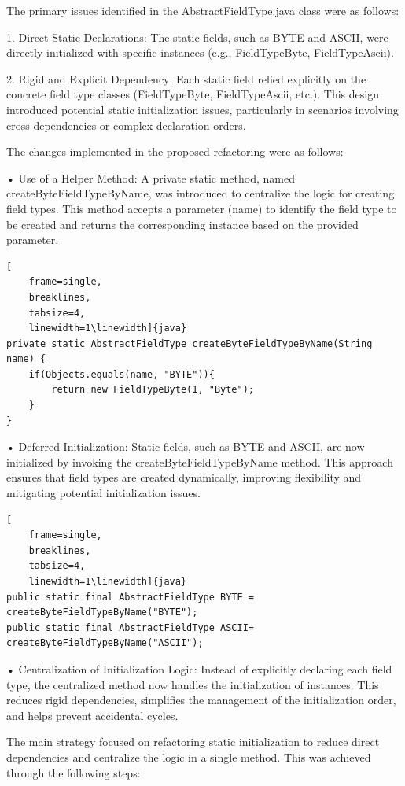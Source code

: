 \documentclass[sigconf]{acmart}
\begin{document}
The primary issues identified in the AbstractFieldType.java class were as follows:
    
    1. Direct Static Declarations:
The static fields, such as BYTE and ASCII, were directly initialized with specific instances (e.g., FieldTypeByte, FieldTypeAscii).

    2. Rigid and Explicit Dependency:
Each static field relied explicitly on the concrete field type classes (FieldTypeByte, FieldTypeAscii, etc.). This design introduced potential static initialization issues, particularly in scenarios involving cross-dependencies or complex declaration orders.

The changes implemented in the proposed refactoring were as follows:

• Use of a Helper Method:
A private static method, named createByteFieldTypeByName, was introduced to centralize the logic for creating field types. This method accepts a parameter (name) to identify the field type to be created and returns the corresponding instance based on the provided parameter.

\begin{lstlisting}[
    frame=single,
    breaklines,
    tabsize=4,
    linewidth=1\linewidth]{java}
private static AbstractFieldType createByteFieldTypeByName(String name) {
    if(Objects.equals(name, "BYTE")){
        return new FieldTypeByte(1, "Byte");
    }
}
\end{lstlisting}

• Deferred Initialization:
Static fields, such as BYTE and ASCII, are now initialized by invoking the createByteFieldTypeByName method. This approach ensures that field types are created dynamically, improving flexibility and mitigating potential initialization issues. 	

\begin{lstlisting}[
    frame=single,
    breaklines,
    tabsize=4,
    linewidth=1\linewidth]{java}
public static final AbstractFieldType BYTE = createByteFieldTypeByName("BYTE");
public static final AbstractFieldType ASCII= createByteFieldTypeByName("ASCII");
\end{lstlisting}

• Centralization of Initialization Logic:
Instead of explicitly declaring each field type, the centralized method now handles the initialization of instances. This reduces rigid dependencies, simplifies the management of the initialization order, and helps prevent accidental cycles. 

The main strategy focused on refactoring static initialization to reduce direct dependencies and centralize the logic in a single method. This was achieved through the following steps:
\end{document}
